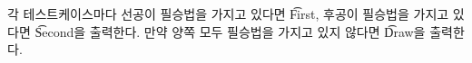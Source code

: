 각 테스트케이스마다 선공이 필승법을 가지고 있다면 \t{First}, 후공이 필승법을 가지고 있다면 \t{Second}을 출력한다. 만약 양쪽 모두 필승법을 가지고 있지 않다면 \t{Draw}을 출력한다.
